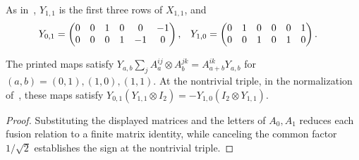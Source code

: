 \begin{definition}
    \label{def:asymex_czy_printed_fusions}
    \leanok
    As in~\cite[Appendix~B]{Liu2025Bialgebraic}, $Y_{1,1}$ is the first
    three rows of $X_{1,1}$, and
    \begin{align}
        Y_{0,1} & =\begin{pmatrix}0&0&1&0&0&-1\\0&0&0&1&-1&0\end{pmatrix}, &
        Y_{1,0} & =\begin{pmatrix}0&1&0&0&0&1\\0&0&1&0&1&0\end{pmatrix}.
        \notag
    \end{align}
\end{definition}

\begin{lemma}
    \label{thm:asymex_czy_nontrivial_associator}
    \leanok
    The printed maps satisfy
    $Y_{a,b}\sum_j A_a^{ij}\otimes A_b^{jk}=A_{a+b}^{ik}Y_{a,b}$
    for $(a,b)=(0,1),(1,0),(1,1)$.
    At the nontrivial triple, in the normalization
    of~\cite[Section~II]{Liu2025Bialgebraic}, these maps satisfy
    $Y_{0,1}(Y_{1,1}\otimes I_2)=-Y_{1,0}(I_2\otimes Y_{1,1})$.
\end{lemma}

\begin{proof}
    \leanok
    Substituting the displayed matrices and the letters of $A_0,A_1$
    reduces each fusion relation to a finite matrix identity, while
    canceling the common factor $1/\sqrt2$ establishes the sign at the
    nontrivial triple.
\end{proof}

